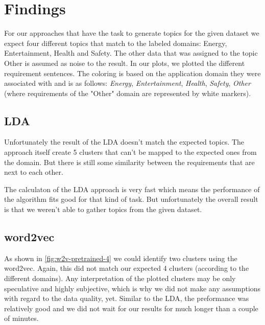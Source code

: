 \section{Findings} %
\label{sec:findings}

For our approaches that have the task to generate topics for the given dataset we expect four different topics that match to the labeled domains: Energy, Entertainment, Health and Safety. The other data that was assigned to the topic Other is assumed as noise to the result.
In our plots, we plotted the different requirement sentences. The coloring is based on the application domain they were associated with and is as follows: \textcolor{clr_energy}{\emph{Energy}}, \textcolor{clr_entertainment}{\emph{Entertainment}}, \textcolor{clr_health}{\emph{Health}}, \textcolor{clr_safety}{\emph{Safety}}, \emph{Other} (where requirements of the "Other" domain are represented by white markers).

\subsection{LDA} %
\label{sub:findings_lda}

Unfortunately the result of the LDA doesn't match the expected topics. The approach itself create 5 clusters that can't be mapped to the expected ones from the domain. But there is still some similarity between the requirements that are next to each other.

The calculaton of the LDA approach is very fast which means the performance of the algorithm fits good for that kind of task. But unfortunately the overall result is that we weren't able to gather topics from the given dataset.

\subsection{word2vec} %
\label{sub:findings_w2v}
As shown in \autoref{fig:w2v-pretrained-4} we could identify two clusters using the word2vec. Again, this did not match our expected 4 clusters (according to the different domains). Any interpretation of the plotted clusters may be only speculative and highly subjective, which is why we did not make any assumptions with regard to the data quality, yet.
Similar to the LDA, the preformance was relatively good and we did not wait for our results for much longer than a couple of minutes.

